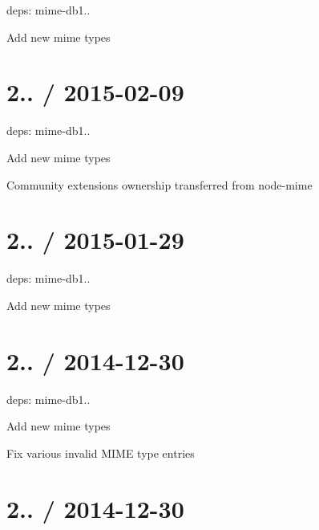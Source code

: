 
\begin{DoxyItemize}
\item deps\+: mime-\/db1..
\begin{DoxyItemize}
\item Add new mime types
\end{DoxyItemize}
\end{DoxyItemize}

\section*{2.. / 2015-\/02-\/09 }


\begin{DoxyItemize}
\item deps\+: mime-\/db1..
\begin{DoxyItemize}
\item Add new mime types
\item Community extensions ownership transferred from {\ttfamily node-\/mime}
\end{DoxyItemize}
\end{DoxyItemize}

\section*{2.. / 2015-\/01-\/29 }


\begin{DoxyItemize}
\item deps\+: mime-\/db1..
\begin{DoxyItemize}
\item Add new mime types
\end{DoxyItemize}
\end{DoxyItemize}

\section*{2.. / 2014-\/12-\/30 }


\begin{DoxyItemize}
\item deps\+: mime-\/db1..
\begin{DoxyItemize}
\item Add new mime types
\item Fix various invalid M\+I\+M\+E type entries
\end{DoxyItemize}
\end{DoxyItemize}

\section*{2.. / 2014-\/12-\/30 }


